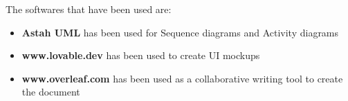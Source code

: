 The softwares that have been used are: \\
\begin{itemize}
    \item \textbf{Astah UML} has been used for Sequence diagrams and Activity diagrams
    \item \textbf{www.lovable.dev} has been used to create UI mockups 
    \item \textbf{www.overleaf.com} has been used as a collaborative writing tool to create the document
\end{itemize}